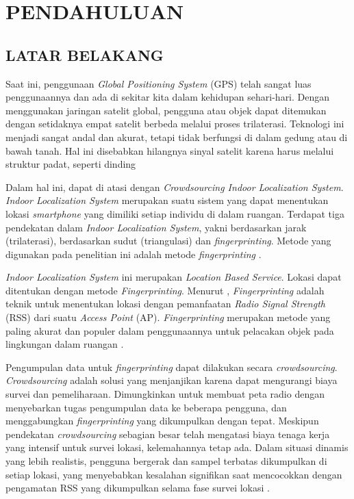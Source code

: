 \fancyhf{}
\fancyfoot[C]{\thepage}


\chapter{PENDAHULUAN}

\section{\uppercase{LATAR BELAKANG}}


\par Saat ini, penggunaan \textit{Global Positioning System} (GPS) telah sangat luas penggunaannya dan ada di sekitar kita dalam kehidupan sehari-hari. Dengan menggunakan jaringan satelit global, pengguna atau objek dapat ditemukan dengan setidaknya empat satelit berbeda melalui proses trilaterasi. Teknologi ini menjadi sangat andal dan akurat, tetapi tidak berfungsi di dalam gedung atau di bawah tanah. Hal ini disebabkan hilangnya sinyal satelit karena harus melalui struktur padat, seperti dinding \citep{Santos2021}

\par Dalam hal ini, dapat di atasi dengan \textit{Crowdsourcing Indoor Localization System}. \textit{Indoor Localization System} merupakan suatu sistem yang dapat menentukan lokasi \textit{smartphone} yang dimiliki setiap individu di dalam ruangan. Terdapat tiga pendekatan dalam \textit{Indoor Localization System}, yakni berdasarkan jarak (trilaterasi), berdasarkan sudut (triangulasi) dan \textit{fingerprinting}. Metode yang digunakan pada penelitian ini adalah metode \textit{fingerprinting} \citep{Santos2021}.

\par \textit{Indoor Localization System} ini merupakan \textit{Location Based Service}. Lokasi dapat ditentukan dengan metode \textit{Fingerprinting}. Menurut \citep{Muhammad2018}, \textit{Fingerprinting} adalah teknik untuk menentukan lokasi dengan pemanfaatan \textit{Radio Signal Strength} (RSS) dari suatu \textit{Access Point} (AP). \textit{Fingerprinting} merupakan metode yang paling akurat dan populer dalam penggunaannya untuk pelacakan objek pada lingkungan dalam ruangan \citep{Yim2010}.

\par Pengumpulan data untuk \textit{fingerprinting} dapat dilakukan secara \textit{crowdsourcing}. \textit{Crowdsourcing} adalah solusi yang menjanjikan karena dapat mengurangi biaya survei dan pemeliharaan. Dimungkinkan untuk membuat peta radio dengan menyebarkan tugas pengumpulan data ke beberapa pengguna, dan menggabungkan \textit{fingerprinting} yang dikumpulkan dengan tepat. Meskipun pendekatan \textit{crowdsourcing} sebagian besar telah mengatasi biaya tenaga kerja yang intensif untuk survei lokasi, kelemahannya tetap ada.  Dalam situasi dinamis yang lebih realistis, pengguna bergerak dan sampel terbatas dikumpulkan di setiap lokasi, yang menyebabkan kesalahan signifikan saat mencocokkan dengan pengamatan RSS yang dikumpulkan selama fase survei lokasi \citep{Sun2019}.

